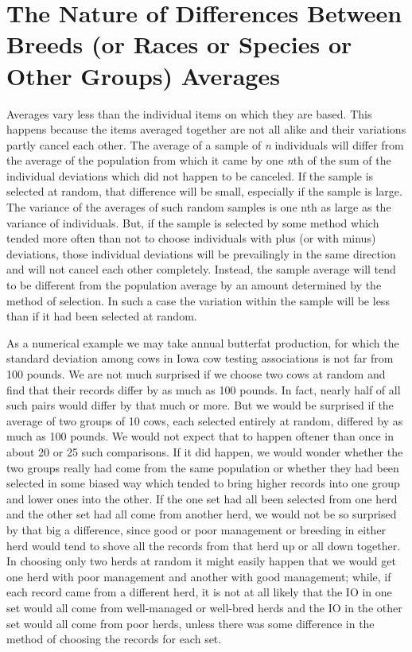 \chapter[The Nature of Differences Between Breeds]{The Nature of Differences Between Breeds (or Races or Species or Other Groups) Averages}
\label{cha:differences-between-group-averages}

Averages vary less than the individual items on which they are
based. This happens because the items averaged together are not all
alike and their variations partly cancel each other. The average of a
sample of \textit{n} individuals will differ from the average of the population
from which it came by one \textit{n}th of the sum of the individual deviations
which did not happen to be canceled. If the sample is selected at random,
that difference will be small, especially if the sample is large. The
variance of the averages of such random samples is one nth as large as
the variance of individuals. But, if the sample is selected by some method
which tended more often than not to choose individuals with plus
(or with minus) deviations, those individual deviations will be prevailingly
in the same direction and will not cancel each other completely.
Instead, the sample average will tend to be different from the population
average by an amount determined by the method of selection. In
such a case the variation within the sample will be less than if it had
been selected at random.

As a numerical example we may take annual butterfat production,
for which the standard deviation among cows in Iowa cow testing associations
is not far from 100 pounds. We are not much surprised if we
choose two cows at random and find that their records differ by as much
as 100 pounds. In fact, nearly half of all such pairs would differ by that
much or more. But we would be surprised if the average of two groups
of 10 cows, each selected entirely at random, differed by as much as 100
pounds. We would not expect that to happen oftener than once in
about 20 or 25 such comparisons. If it did happen, we would wonder
whether the two groups really had come from the same population or
whether they had been selected in some biased way which tended to
bring higher records into one group and lower ones into the other. If
the one set had all been selected from one herd and the other set had all
come from another herd, we would not be so surprised by that big a
difference, since good or poor management or breeding in either herd
would tend to shove all the records from that herd up or all down
together. In choosing only two herds at random it might easily happen
that we would get one herd with poor management and another with
good management; while, if each record came from a different herd, it
is not at all likely that the IO in one set would all come from well-managed
or well-bred herds and the IO in the other set would all come from
poor herds, unless there was some difference in the method of choosing
the records for each set.

